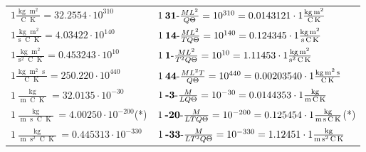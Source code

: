 \begin{center}
\begin{longtable}{l l}
{\color{black}$1 \bm{\mathrm{ }}\frac{\operatorname{kg}\operatorname{m}^2}{\operatorname{C}\operatorname{K}} = 32.2554\cdot10^{310} $}&
	{\color{black}$1\:\text{\textbf{31}-} \frac{ML^2}{Q\Theta}=10^{310} = 0.0143121 \cdot 1 \bm{\mathrm{ }}\frac{\operatorname{kg}\operatorname{m}^2}{\operatorname{C}\operatorname{K}}$}\\
{\color{black}$1 \bm{\mathrm{ }}\frac{\operatorname{kg}\operatorname{m}^2}{\operatorname{s}\operatorname{C}\operatorname{K}} = 4.03422\cdot10^{140} $}&
	{\color{black}$1\:\text{\textbf{14}-} \frac{ML^2}{TQ\Theta}=10^{140} = 0.124345 \cdot 1 \bm{\mathrm{ }}\frac{\operatorname{kg}\operatorname{m}^2}{\operatorname{s}\operatorname{C}\operatorname{K}}$}\\
{\color{black}$1 \bm{\mathrm{ }}\frac{\operatorname{kg}\operatorname{m}^2}{\operatorname{s}^2\operatorname{C}\operatorname{K}} = 0.453243\cdot10^{10} $}&
	{\color{black}$1\:\text{\textbf{1}-} \frac{ML^2}{T^2Q\Theta}=10^{10} = 1.11453 \cdot 1 \bm{\mathrm{ }}\frac{\operatorname{kg}\operatorname{m}^2}{\operatorname{s}^2\operatorname{C}\operatorname{K}}$}\\
{\color{black}$1 \bm{\mathrm{ }}\frac{\operatorname{kg}\operatorname{m}^2\operatorname{s}}{\operatorname{C}\operatorname{K}} = 250.220\cdot10^{440} $}&
	{\color{black}$1\:\text{\textbf{44}-} \frac{ML^2T}{Q\Theta}=10^{440} = 0.00203540 \cdot 1 \bm{\mathrm{ }}\frac{\operatorname{kg}\operatorname{m}^2\operatorname{s}}{\operatorname{C}\operatorname{K}}$}\\
{\color{black}$1 \bm{\mathrm{ }}\frac{\operatorname{kg}}{\operatorname{m}\operatorname{C}\operatorname{K}} = 32.0135\cdot10^{-30} $}&
	{\color{black}$1\:\text{\textbf{-3}-} \frac{M}{LQ\Theta}=10^{-30} = 0.0144353 \cdot 1 \bm{\mathrm{ }}\frac{\operatorname{kg}}{\operatorname{m}\operatorname{C}\operatorname{K}}$}\\
{\color{black}$1 \bm{\mathrm{ }}\frac{\operatorname{kg}}{\operatorname{m}\operatorname{s}\operatorname{C}\operatorname{K}} = 4.00250\cdot10^{-200} $}\quad(*)&
	{\color{black}$1\:\text{\textbf{-20}-} \frac{M}{LTQ\Theta}=10^{-200} = 0.125454 \cdot 1 \bm{\mathrm{ }}\frac{\operatorname{kg}}{\operatorname{m}\operatorname{s}\operatorname{C}\operatorname{K}}$}\quad(*)\\
{\color{black}$1 \bm{\mathrm{ }}\frac{\operatorname{kg}}{\operatorname{m}\operatorname{s}^2\operatorname{C}\operatorname{K}} = 0.445313\cdot10^{-330} $}&
	{\color{black}$1\:\text{\textbf{-33}-} \frac{M}{LT^2Q\Theta}=10^{-330} = 1.12451 \cdot 1 \bm{\mathrm{ }}\frac{\operatorname{kg}}{\operatorname{m}\operatorname{s}^2\operatorname{C}\operatorname{K}}$}\\

\end{longtable}
\end{center}
